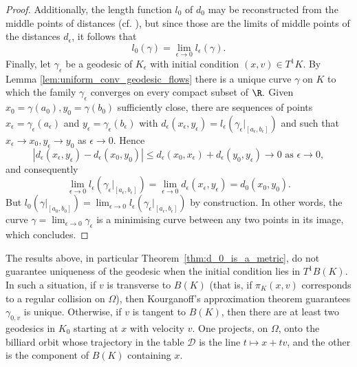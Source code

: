 \documentclass[reqno,11pt]{amsart}
\begin{document}
\begin{proof}
    Additionally, the length function \( l_0 \) of \( d_0 \) may be reconstructed from the middle points of distances (cf. \cite[Theorem 2.4.16.]{burago2022course}), but since those are the limits of middle points of the distances \( d_\epsilon \), it follows that
    \[
        l_0(\gamma) = \lim_{\epsilon \to 0}l_\epsilon(\gamma).
    \]
    Finally, let \( \gamma_\epsilon\) be a geodesic of \( K_\epsilon \) with initial condition \( (x, v) \in T^1K \).
    By Lemma \ref{lem:uniform_conv_geodesic_flows} there is a unique curve \( \gamma \) on \( K \) to which the family \( \gamma_\epsilon \) converges on every compact subset of \( \R. \)
    Given \(x_0 = \gamma(a_0), y_0 = \gamma(b_0)\) sufficiently close, there are sequences of points \( x_\epsilon = \gamma_\epsilon(a_\epsilon) \) and \( y_\epsilon = \gamma_\epsilon(b_\epsilon) \) with \( d_\epsilon(x_\epsilon, y_\epsilon) = l_\epsilon(\gamma_\epsilon\rvert_{[a_\epsilon, b_\epsilon]}) \) and such that
    \( x_\epsilon \to x_0, y_\epsilon \to y_0 \) as \( \epsilon \to 0 \).
    Hence
    \[
        |d_\epsilon(x_\epsilon, y_\epsilon) - d_\epsilon(x_0,y_0)| \leq d_\epsilon(x_0, x_\epsilon) + d_\epsilon(y_0, y_\epsilon) \to 0 \text{ as } \epsilon \to 0,
    \]
    and consequently 
    \[
        \lim_{\epsilon \to 0}l_\epsilon(\gamma_\epsilon\rvert_{[a_\epsilon, b_\epsilon]}) = \lim_{\epsilon \to 0}d_\epsilon(x_\epsilon, y_\epsilon) = d_0(x_0, y_0).
    \]
    But \(l_0(\gamma\rvert_{[a_0, b_0]}) = \lim_{\epsilon \to 0}l_\epsilon(\gamma_\epsilon\rvert_{[a_\epsilon, b_\epsilon]})\) by construction.
    In other words, the curve \( \gamma =\lim_{\epsilon \to 0}\gamma_\epsilon \) is a minimising curve between any two points in its image, which concludes.
\end{proof}

\begin{remark}
    The results above, in particular Theorem~\ref{thm:d_0_is_a_metric}, do not guarantee uniqueness of the geodesic  when the initial condition lies in \(T^1B(K)\).
    In such a situation, if \(v\) is transverse to \(B(K)\) (that is, if \(\pi_K(x,v)\) corresponds to a regular collision on \(\Omega\)), then Kourganoff's approximation theorem guarantees \(\gamma_{0,v}\) is unique.
    Otherwise, if \(v\) is tangent to \(B(K)\), then there are at least two geodesics in \(K_0\) starting at \(x\) with velocity \(v\). 
    One projects, on \(\Omega\), onto the billiard orbit whose trajectory in the table \(\mathcal{D}\) is the line \(t \mapsto x + tv\), and the other is the component of \(B(K)\) containing \(x\).
\end{remark}
\end{document}
